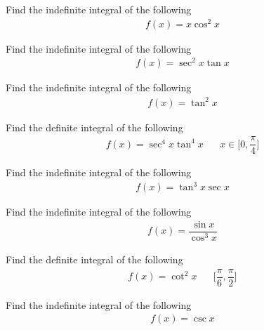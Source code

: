 \begin{exercise}
Find the indefinite integral of the following
\begin{align*}
    f(x) = x \cos^{2} x
\end{align*}
\end{exercise}

\begin{exercise}
Find the indefinite integral of the following
\begin{align*}
    f(x) = \sec^{2} x \tan x
\end{align*}
\end{exercise}

\begin{exercise}
Find the indefinite integral of the following
\begin{align*}
    f(x) = \tan^{2} x 
\end{align*}
\end{exercise}

\begin{exercise}
Find the definite integral of the following
\begin{align*}
    f(x) = \sec^{4} x \tan^{4} x \hspace{20pt} x \in \Big[0, \dfrac{\pi}{4} \Big]
\end{align*}
\end{exercise}

\begin{exercise}
Find the indefinite integral of the following
\begin{align*}
    f(x) = \tan^{3} x \sec x
\end{align*}
\end{exercise}

\begin{exercise}
Find the indefinite integral of the following
\begin{align*}
    f(x) = \dfrac{\sin x}{\cos^{3} x}
\end{align*}
\end{exercise}

\begin{exercise}
Find the definite integral of the following
\begin{align*}
    f(x) = \cot^{2} x \hspace{20pt} \Big[\dfrac{\pi}{6}, \dfrac{\pi}{2}\Big]
\end{align*}
\end{exercise}

\begin{exercise}
Find the indefinite integral of the following
\begin{align*}
    f(x) = \csc x
\end{align*}
\end{exercise}

